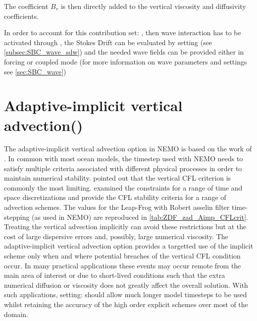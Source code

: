 \documentclass[../main/NEMO_manual]{subfiles}
\begin{document}
The coefficient $B_{v}$ is then directly added to the vertical viscosity
and diffusivity coefficients.

In order to account for this contribution set: ,
then wave interaction has to be activated through ,
the Stokes Drift can be evaluated by setting 
(see \autoref{subsec:SBC_wave_sdw})
and the needed wave fields can be provided either in forcing or coupled mode
(for more information on wave parameters and settings see \autoref{sec:SBC_wave})

\section[Adaptive-implicit vertical advection (\forcode{ln_zad_Aimp})]{Adaptive-implicit vertical advection(\protect{})}
\label{subsec:ZDF_aimp}

The adaptive-implicit vertical advection option in NEMO is based on the work of
\citep{shchepetkin_OM15}.  In common with most ocean models, the timestep used with NEMO
needs to satisfy multiple criteria associated with different physical processes in order
to maintain numerical stability. \citep{shchepetkin_OM15} pointed out that the vertical
CFL criterion is commonly the most limiting. \citep{lemarie.debreu.ea_OM15} examined the
constraints for a range of time and space discretizations and provide the CFL stability
criteria for a range of advection schemes. The values for the Leap-Frog with Robert
asselin filter time-stepping (as used in NEMO) are reproduced in
\autoref{tab:ZDF_zad_Aimp_CFLcrit}. Treating the vertical advection implicitly can avoid these
restrictions but at the cost of large dispersive errors and, possibly, large numerical
viscosity. The adaptive-implicit vertical advection option provides a targetted use of the
implicit scheme only when and where potential breaches of the vertical CFL condition
occur. In many practical applications these events may occur remote from the main area of
interest or due to short-lived conditions such that the extra numerical diffusion or
viscosity does not greatly affect the overall solution. With such applications, setting:
 should allow much longer model timesteps to be used whilst
retaining the accuracy of the high order explicit schemes over most of the domain.
\end{document}
